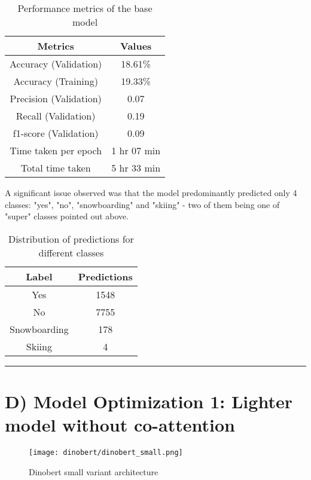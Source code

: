 \documentclass[conference]{IEEEtran}
\begin{document}
\begin{table}[H]
    \centering
    \begin{tabular}{|c|c|}
        \hline
        \textbf{Metrics} & \textbf{Values} \\
        \hline
        Accuracy (Validation) & 18.61\% \\
        Accuracy (Training) & 19.33\% \\
        Precision (Validation) & 0.07 \\
        Recall (Validation) & 0.19 \\
        f1-score (Validation) & 0.09 \\
        Time taken per epoch & 1 hr 07 min \\
        Total time taken & 5 hr 33 min\\ 
        \hline
    \end{tabular}
    \vspace{1mm}
    \caption{Performance metrics of the base model}
\end{table}
A significant issue observed was that the model predominantly predicted only 4 classes: "yes", "no", "snowboarding" and "skiing" - two of them being one of "super" classes pointed out above.
\begin{table}[H]
    \centering
    \begin{tabular}{|c|c|}
        \hline
        \textbf{Label} & \textbf{Predictions} \\
        \hline
        Yes & 1548 \\
        No & 7755 \\
        Snowboarding & 178\\
        Skiing & 4\\
        \hline
    \end{tabular}
    \vspace{1mm}
    \caption{Distribution of predictions for different classes}
\end{table}


\vspace{0.5cm} \hrule{} \vspace{0.5cm}
\section*{\textbf{D) Model Optimization 1: Lighter model without co-attention}}
\label{smallermodel}
\begin{figure*}
    \centering
    \texttt{[image: dinobert/dinobert\_small.png]}
    \caption{Dinobert small variant architecture}
    \label{dinobert_small}
\end{figure*}
\end{document}
